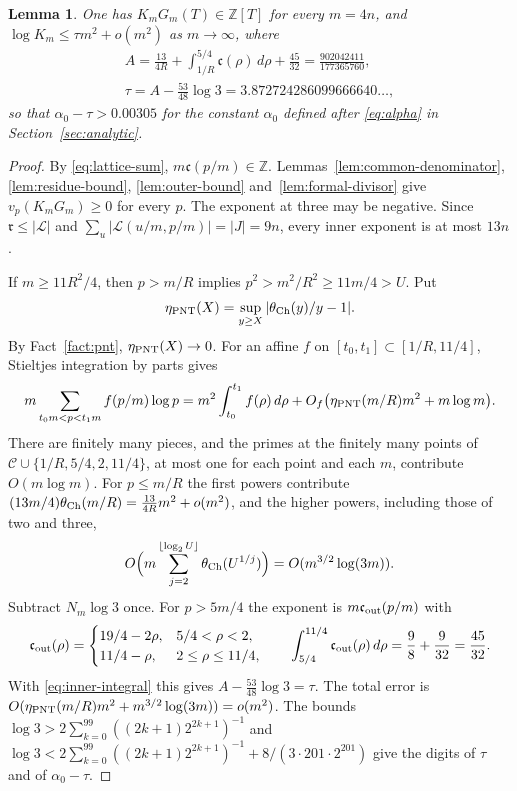 \documentclass{amsart}
\newtheorem{lemma}{Lemma}[section]
\numberwithin{equation}{section}
\numberwithin{table}{section}
\newcommand{\Z}{\mathbb{Z}}
\newcommand{\Avalue}{\frac{902042411}{177365760}}
\newcommand{\tauvalue}{3.872724286099666640}
\newcommand{\marginvalue}{0.00305}
\begin{document}
\begin{lemma}\label{lem:integerization}
One has $K_mG_m(T)\in\Z[T]$ for every $m=4n$, and
$\log K_m\le\tau m^2+o(m^2)$ as $m\to\infty$, where
\begin{equation}\label{eq:tau}
\begin{gathered}
 A=\frac{13}{4R}+\int_{1/R}^{5/4}\mathfrak c(\rho)\,d\rho+\frac{45}{32}
  =\Avalue,\\
 \tau=A-\frac{53}{48}\log3=\tauvalue\ldots,
\end{gathered}
\end{equation}
so that $\alpha_0-\tau>\marginvalue$ for the constant $\alpha_0$ defined after
\eqref{eq:alpha} in Section~\ref{sec:analytic}.
\end{lemma}
\begin{proof}
By \eqref{eq:lattice-sum}, $m\mathfrak c(p/m)\in\Z$. Lemmas~\ref{lem:common-denominator},
\ref{lem:residue-bound}, \ref{lem:outer-bound} and~\ref{lem:formal-divisor}
give $v_p(K_mG_m)\ge0$ for every $p$. The exponent at three may be
negative. Since $\mathfrak r\le|\mathcal L|$ and
$\sum_u|\mathcal L(u/m,p/m)|=|J|=9n$, every inner exponent is at most
$13n$.

If $m\ge11R^2/4$, then $p>m/R$ implies $p^2>m^2/R^2\ge11m/4>U$. Put
\[
 \eta_{\rm PNT}(X)=\sup_{y\ge X}|\theta_{\rm Ch}(y)/y-1|.
\]
By Fact~\ref{fact:pnt}, $\eta_{\rm PNT}(X)\to0$.
For an affine $f$ on $[t_0,t_1]\subset[1/R,11/4]$, Stieltjes integration by
parts gives
\begin{equation*}
 m\sum_{t_0m<p<t_1m} f(p/m)\log p
 =m^2\int_{t_0}^{t_1} f(\rho)\,d\rho
  +O_f\bigl(\eta_{\rm PNT}(m/R)m^2+m\log m\bigr).
\end{equation*}
There are finitely many pieces, and the primes at the finitely many points
of $\mathcal C\cup\{1/R,5/4,2,11/4\}$, at most one for each point and each
$m$, contribute $O(m\log m)$. For $p\le m/R$ the first powers contribute
$(13m/4)\theta_{\rm Ch}(m/R)=\frac{13}{4R}m^2+o(m^2)$, and the higher powers, including
those of two and three,
\[
 O\Bigl(m\sum_{j=2}^{\lfloor\log_2U\rfloor}\theta_{\rm Ch}(U^{1/j})\Bigr)
 =O(m^{3/2}\log(3m)).
\]
Subtract $N_m\log3$ once. For $p>5m/4$ the exponent is $m\mathfrak c_{\rm out}(p/m)$
with
\[
 \mathfrak c_{\rm out}(\rho)=\begin{cases}
 19/4-2\rho,&5/4<\rho<2,\\
 11/4-\rho,&2\le\rho\le11/4,
 \end{cases}
 \qquad
 \int_{5/4}^{11/4}\mathfrak c_{\rm out}(\rho)\,d\rho=\frac98+\frac9{32}=\frac{45}{32}.
\]
With \eqref{eq:inner-integral} this gives $A-\frac{53}{48}\log3=\tau$.
The total error is
$O(\eta_{\rm PNT}(m/R)m^2+m^{3/2}\log(3m))=o(m^2)$. The bounds
$\log3>2\sum_{k=0}^{99}((2k+1)2^{2k+1})^{-1}$ and
$\log3<2\sum_{k=0}^{99}((2k+1)2^{2k+1})^{-1}+8/(3\cdot201\cdot2^{201})$
give the digits of $\tau$ and of $\alpha_0-\tau$.
\end{proof}
\end{document}
